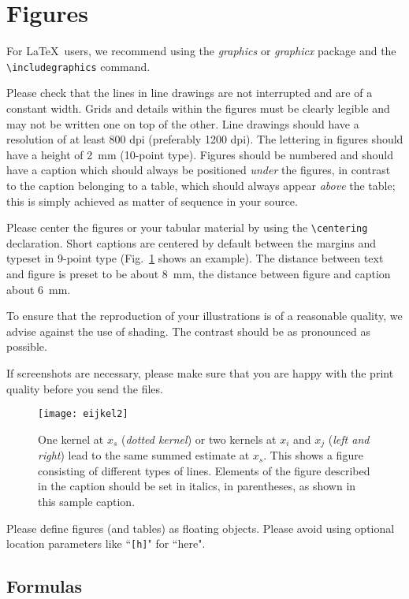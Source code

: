 \documentclass[runningheads,a4paper]{llncs}
\begin{document}
\section{Figures}

For \LaTeX\ users, we recommend using the \emph{graphics} or \emph{graphicx}
package and the \verb+\includegraphics+ command.

Please check that the lines in line drawings are not
interrupted and are of a constant width. Grids and details within the
figures must be clearly legible and may not be written one on top of
the other. Line drawings should have a resolution of at least 800 dpi
(preferably 1200 dpi). The lettering in figures should have a height of
2~mm (10-point type). Figures should be numbered and should have a
caption which should always be positioned \emph{under} the figures, in
contrast to the caption belonging to a table, which should always appear
\emph{above} the table; this is simply achieved as matter of sequence in
your source.

Please center the figures or your tabular material by using the \verb+\centering+
declaration. Short captions are centered by default between the margins
and typeset in 9-point type (Fig.~\ref{fig:example} shows an example).
The distance between text and figure is preset to be about 8~mm, the
distance between figure and caption about 6~mm.

To ensure that the reproduction of your illustrations is of a reasonable
quality, we advise against the use of shading. The contrast should be as
pronounced as possible.

If screenshots are necessary, please make sure that you are happy with
the print quality before you send the files.
\begin{figure}
\centering
\texttt{[image: eijkel2]}
\caption{One kernel at $x_s$ (\emph{dotted kernel}) or two kernels at
$x_i$ and $x_j$ (\textit{left and right}) lead to the same summed estimate
at $x_s$. This shows a figure consisting of different types of
lines. Elements of the figure described in the caption should be set in
italics, in parentheses, as shown in this sample caption.}
\label{fig:example}
\end{figure}

Please define figures (and tables) as floating objects. Please avoid
using optional location parameters like ``\verb+[h]+" for ``here".

\subsection{Formulas}
\end{document}
